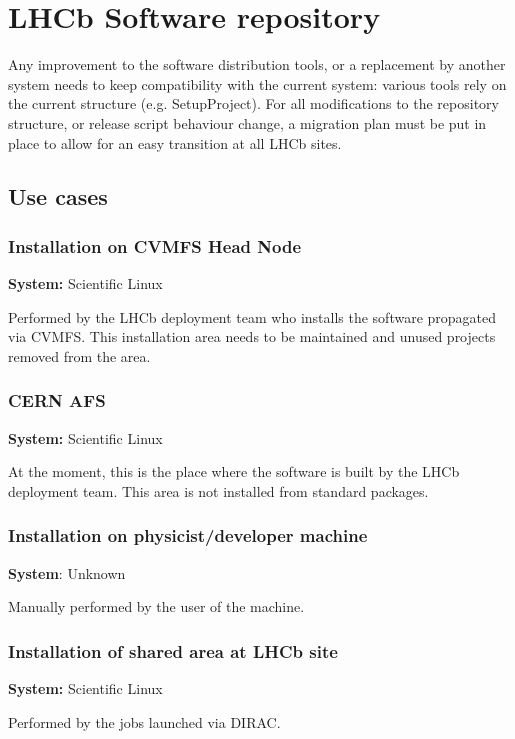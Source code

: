 \documentclass{lhcbnote}
\begin{document}
\pagebreak

\section{LHCb Software repository}

Any improvement to the software distribution tools, or a replacement by another system needs to keep compatibility with the current system: various tools rely on the current structure (e.g. SetupProject). For all modifications to the repository structure, or release script behaviour change, a migration plan must be put in place to allow for an easy transition at all LHCb sites.

\subsection{Use cases}

\subsubsection{Installation on CVMFS Head Node}
\textbf{System:} Scientific Linux

Performed by the LHCb deployment team who installs the software propagated via CVMFS. This installation area needs to be maintained and unused projects removed from the area.

\subsubsection{CERN AFS}
\textbf{System:} Scientific Linux

At the moment, this is the place where the software is built by the LHCb deployment team. This area is not installed from standard packages.

\subsubsection{Installation on physicist/developer machine}
\textbf{System}: Unknown

Manually performed by the user of the machine.

\subsubsection{Installation of shared area at LHCb site}
\textbf{System:} Scientific Linux

Performed by the jobs launched via DIRAC.
\end{document}
